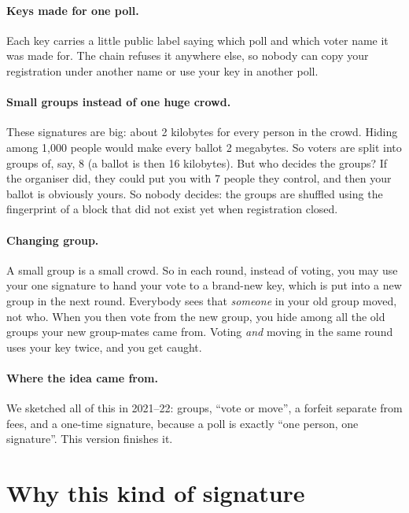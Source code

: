 \documentclass[11pt,a4paper]{article}
\begin{document}
\paragraph{Keys made for one poll.} Each key carries a little public label
saying which poll and which voter name it was made for. The chain refuses
it anywhere else, so nobody can copy your registration under another name
or use your key in another poll.

\paragraph{Small groups instead of one huge crowd.} These signatures are
big: about 2 kilobytes for every person in the crowd. Hiding among 1{,}000
people would make every ballot 2 megabytes. So voters are split into groups
of, say, 8 (a ballot is then 16 kilobytes). But who decides the groups? If
the organiser did, they could put you with 7 people they control, and then
your ballot is obviously yours. So nobody decides: the groups are shuffled
using the fingerprint of a block that did not exist yet when registration
closed.

\paragraph{Changing group.} A small group is a small crowd. So in each
round, instead of voting, you may use your one signature to hand your vote
to a brand-new key, which is put into a new group in the next round.
Everybody sees that \emph{someone} in your old group moved, not who. When
you then vote from the new group, you hide among all the old groups your
new group-mates came from. Voting \emph{and} moving in the same round uses
your key twice, and you get caught.

\paragraph{Where the idea came from.} We sketched all of this in 2021--22:
groups, ``vote or move'', a forfeit separate from fees, and a one-time
signature, because a poll is exactly ``one person, one signature''. This
version finishes it.

\section{Why this kind of signature}
\end{document}

